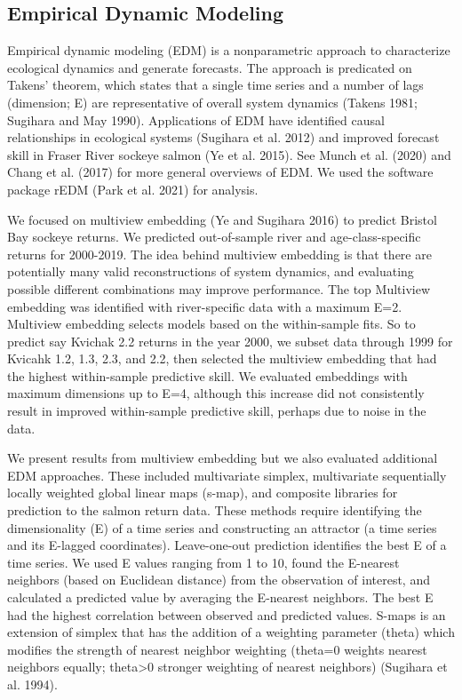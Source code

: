 \documentclass[
]{article}
\begin{document}
\hypertarget{empirical-dynamic-modeling}{%
\subsection*{Empirical Dynamic Modeling}\label{empirical-dynamic-modeling}}

Empirical dynamic modeling (EDM) is a nonparametric approach to characterize ecological dynamics and generate forecasts. The approach is predicated on Takens' theorem, which states that a single time series and a number of lags (dimension; E) are representative of overall system dynamics (Takens 1981; Sugihara and May 1990). Applications of EDM have identified causal relationships in ecological systems (Sugihara et al. 2012) and improved forecast skill in Fraser River sockeye salmon (Ye et al. 2015). See Munch et al. (2020) and Chang et al. (2017) for more general overviews of EDM. We used the software package rEDM (Park et al. 2021) for analysis.

We focused on multiview embedding (Ye and Sugihara 2016) to predict Bristol Bay sockeye returns. We predicted out-of-sample river and age-class-specific returns for 2000-2019. The idea behind multiview embedding is that there are potentially many valid reconstructions of system dynamics, and evaluating possible different combinations may improve performance. The top Multiview embedding was identified with river-specific data with a maximum E=2. Multiview embedding selects models based on the within-sample fits. So to predict say Kvichak 2.2 returns in the year 2000, we subset data through 1999 for Kvicahk 1.2, 1.3, 2.3, and 2.2, then selected the multiview embedding that had the highest within-sample predictive skill. We evaluated embeddings with maximum dimensions up to E=4, although this increase did not consistently result in improved within-sample predictive skill, perhaps due to noise in the data.

We present results from multiview embedding but we also evaluated additional EDM approaches. These included multivariate simplex, multivariate sequentially locally weighted global linear maps (s-map), and composite libraries for prediction to the salmon return data. These methods require identifying the dimensionality (E) of a time series and constructing an attractor (a time series and its E-lagged coordinates). Leave-one-out prediction identifies the best E of a time series. We used E values ranging from 1 to 10, found the E-nearest neighbors (based on Euclidean distance) from the observation of interest, and calculated a predicted value by averaging the E-nearest neighbors. The best E had the highest correlation between observed and predicted values. S-maps is an extension of simplex that has the addition of a weighting parameter (theta) which modifies the strength of nearest neighbor weighting (theta=0 weights nearest neighbors equally; theta\textgreater0 stronger weighting of nearest neighbors) (Sugihara et al. 1994).
\end{document}
